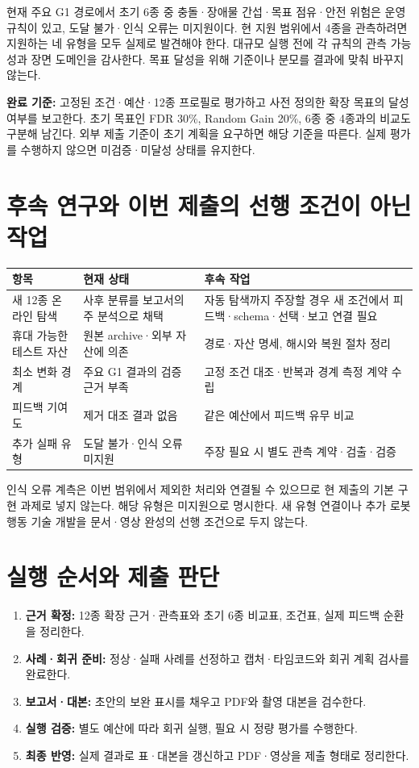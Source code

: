 \documentclass[a4paper,11pt]{article}
\begin{document}
현재 주요 G1 경로에서 초기 6종 중 충돌·장애물 간섭·목표 점유·안전 위험은
운영 규칙이 있고, 도달 불가·인식 오류는 미지원이다. 현 지원 범위에서 4종을
관측하려면 지원하는 네 유형을 모두 실제로 발견해야 한다. 대규모 실행 전에
각 규칙의 관측 가능성과 장면 도메인을 감사한다. 목표 달성을 위해 기준이나
분모를 결과에 맞춰 바꾸지 않는다.

\textbf{완료 기준:} 고정된 조건·예산·12종 프로필로 평가하고 사전 정의한 확장 목표의
달성 여부를 보고한다. 초기 목표인 FDR 30\%, Random Gain 20\%, 6종 중 4종과의
비교도 구분해 남긴다. 외부 제출 기준이 초기 계획을 요구하면 해당 기준을 따른다.
실제 평가를 수행하지 않으면 미검증·미달성 상태를 유지한다.

\section{후속 연구와 이번 제출의 선행 조건이 아닌 작업}
{\small
\begin{tabularx}{\linewidth}{@{}p{36mm}YY@{}}
\toprule
항목 & 현재 상태 & 후속 작업 \\
\midrule
새 12종 온라인 탐색 & 사후 분류를 보고서의 주 분석으로 채택 & 자동 탐색까지 주장할 경우 새 조건에서 피드백·schema·선택·보고 연결 필요 \\
휴대 가능한 테스트 자산 & 원본 archive·외부 자산에 의존 & 경로·자산 명세, 해시와 복원 절차 정리 \\
최소 변화 경계 & 주요 G1 결과의 검증 근거 부족 & 고정 조건 대조·반복과 경계 측정 계약 수립 \\
피드백 기여도 & 제거 대조 결과 없음 & 같은 예산에서 피드백 유무 비교 \\
추가 실패 유형 & 도달 불가·인식 오류 미지원 & 주장 필요 시 별도 관측 계약·검출·검증 \\
\bottomrule
\end{tabularx}}

인식 오류 계측은 이번 범위에서 제외한 처리와 연결될 수 있으므로 현 제출의
기본 구현 과제로 넣지 않는다. 해당 유형은 미지원으로 명시한다. 새 유형 연결이나
추가 로봇 행동 기술 개발을 문서·영상 완성의 선행 조건으로 두지 않는다.

\section{실행 순서와 제출 판단}
\begin{enumerate}
\item \textbf{근거 확정:} 12종 확장 근거·관측표와 초기 6종 비교표, 조건표, 실제 피드백 순환을 정리한다.
\item \textbf{사례·회귀 준비:} 정상·실패 사례를 선정하고 캡처·타임코드와 회귀 계획 검사를 완료한다.
\item \textbf{보고서·대본:} 초안의 보완 표시를 채우고 PDF와 촬영 대본을 검수한다.
\item \textbf{실행 검증:} 별도 예산에 따라 회귀 실행, 필요 시 정량 평가를 수행한다.
\item \textbf{최종 반영:} 실제 결과로 표·대본을 갱신하고 PDF·영상을 제출 형태로 정리한다.
\end{enumerate}
\end{document}
